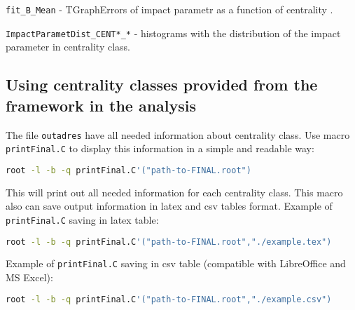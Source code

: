 \documentclass[11pt]{article}
\begin{document}
\texttt{fit\_B\_Mean} - TGraphErrors of impact parametr as a function of centrality .

\texttt{ImpactParametDist\_CENT*\_*} - histograms with the distribution of the impact parameter in centrality class.
\subsection{Using centrality classes provided from the framework in the analysis}
The file \texttt{outadres} have all needed information about centrality class.
Use macro \texttt{printFinal.C} to display this information in a simple and readable way:
\begin{lstlisting}[language=bash,caption={}]
 root -l -b -q printFinal.C'("path-to-FINAL.root")
\end{lstlisting}
This will print out all needed information for each centrality class.
This macro also can save output information in latex and csv tables format.
Example of \texttt{printFinal.C} saving in latex table:
\begin{lstlisting}[language=bash,caption={}]
 root -l -b -q printFinal.C'("path-to-FINAL.root","./example.tex")
 \end{lstlisting}
 Example of \texttt{printFinal.C} saving in csv table (compatible with LibreOffice and MS Excel):
\begin{lstlisting}[language=bash,caption={}]
 root -l -b -q printFinal.C'("path-to-FINAL.root","./example.csv")
\end{lstlisting}
\end{document}
